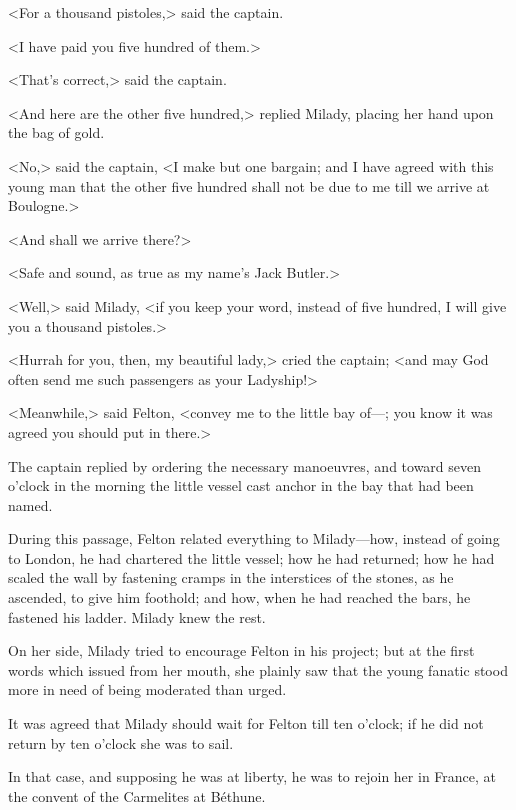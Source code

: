 <For a thousand pistoles,> said the captain. 

<I have paid you five hundred of them.> 

<That's correct,> said the captain. 

<And here are the other five hundred,> replied Milady, placing her hand upon the bag of gold. 

<No,> said the captain, <I make but one bargain; and I have agreed with this young man that the other five hundred shall not be due to me till we arrive at Boulogne.> 

<And shall we arrive there?> 

<Safe and sound, as true as my name's Jack Butler.> 

<Well,> said Milady, <if you keep your word, instead of five hundred, I will give you a thousand pistoles.> 

<Hurrah for you, then, my beautiful lady,> cried the captain; <and may God often send me such passengers as your Ladyship!> 

<Meanwhile,> said Felton, <convey me to the little bay of—; you know it was agreed you should put in there.> 

The captain replied by ordering the necessary manoeuvres, and toward seven o'clock in the morning the little vessel cast anchor in the bay that had been named. 

During this passage, Felton related everything to Milady—how, instead of going to London, he had chartered the little vessel; how he had returned; how he had scaled the wall by fastening cramps in the interstices of the stones, as he ascended, to give him foothold; and how, when he had reached the bars, he fastened his ladder. Milady knew the rest. 

On her side, Milady tried to encourage Felton in his project; but at the first words which issued from her mouth, she plainly saw that the young fanatic stood more in need of being moderated than urged. 

It was agreed that Milady should wait for Felton till ten o'clock; if he did not return by ten o'clock she was to sail. 

In that case, and supposing he was at liberty, he was to rejoin her in France, at the convent of the Carmelites at Béthune.
